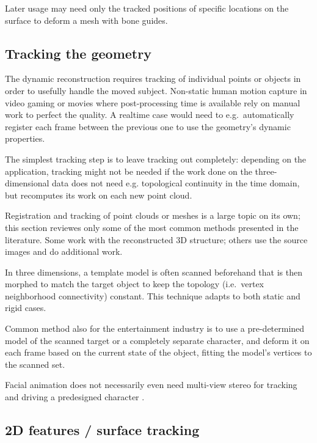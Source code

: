 Later usage may need only the tracked positions of specific locations on the surface to deform a mesh with bone guides.


\subsection{Tracking the geometry} %




The dynamic reconstruction requires tracking of individual points or objects in order to usefully handle the moved subject.
Non-static human motion capture in video gaming or movies where post-processing time is available rely on manual work to perfect the quality.
A realtime case would need to e.g.~automatically register each frame between the previous one to use the geometry's dynamic properties.

The simplest tracking step is to leave tracking out completely: depending on the application, tracking might not be needed if the work done on the three-dimensional data does not need e.g. topological continuity in the time domain, but recomputes its work on each new point cloud.

Registration and tracking of point clouds or meshes is a large topic on its own; this section reviewes only some of the most common methods presented in the literature.
Some work with the reconstructed 3D structure; others use the source images and do additional work.

In three dimensions, a template model is often scanned beforehand that is then morphed to match the target object to keep the topology (i.e.~vertex neighborhood connectivity) constant.
This technique adapts to both static and rigid cases.
\cite{bojsen2012tracking,li2009robust}

Common method also for the entertainment industry is to use a pre-determined model of the scanned target or a completely separate character, and deform it on each frame based on the current state of the object, fitting the model's vertices to the scanned set.

Facial animation does not necessarily even need multi-view stereo for tracking and driving a predesigned character \cite{chuang2002performance,deng2007computer}.


\subsection{2D features / surface tracking} %

